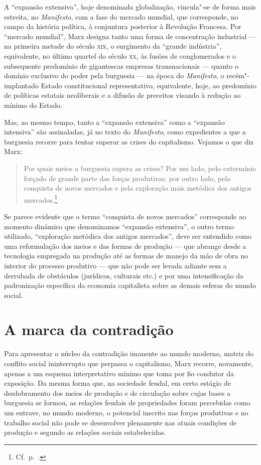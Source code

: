 A “expansão extensiva”, hoje denominada globalização, vincula"-se de
forma mais estreita, no \textit{Manifesto}, com a fase do mercado
mundial, que corresponde, no campo da história política, à conjuntura
posterior à Revolução Francesa. Por “mercado mundial”, Marx designa
tanto uma forma de concentração industrial --- na primeira metade do
século \textsc{xix}, o surgimento da “grande indústria”, equivalente, no último
quartel do século \textsc{xx}, às fusões de conglomerados e o subsequente
predomínio de gigantescas empresas transnacionais --- quanto o domínio
exclusivo do poder pela burguesia --- na época do \textit{Manifesto}, o
recém"-implantado Estado constitucional representativo, equivalente,
hoje, ao predomínio de políticas estatais neoliberais e a difusão de
preceitos visando à redução ao mínimo do Estado.

Mas, ao mesmo tempo, tanto a “expansão extensiva” como a “expansão
intensiva” são assinaladas, já no texto do \textit{Manifesto}, como
expedientes a que a burguesia recorre para tentar superar as crises do
capitalismo. Vejamos o que diz Marx:

\begin{quote} 
Por quais meios a burguesia supera as crises? Por um lado, pelo
extermínio forçado de grande parte das forças produtivas; por outro
lado, pela conquista de novos mercados e pela exploração mais metódica
dos antigos mercados.\footnote{ Cf.~p.~\pageref{9}.}
\end{quote} 

Se parece evidente que o termo “conquista de novos mercados” corresponde
ao momento dinâmico que denominamos “expansão extensiva”, o outro termo
utilizado, “exploração metódica dos antigos mercados”, deve ser
entendido como uma reformulação dos meios e das formas de produção --- que
abrange desde a tecnologia empregada na produção até as formas de
manejo da mão de obra no interior do processo produtivo --- que não
pode ser levada adiante sem a derrubada de obstáculos (jurídicos,
culturais etc.) e por uma intensificação da padronização específica da
economia capitalista sobre as demais esferas do mundo social.

\section*{A marca da contradição}

Para apresentar o núcleo da contradição imanente ao mundo moderno,
matriz do conflito social ininterrupto que perpassa o capitalismo, Marx
recorre, novamente, apenas a um esquema interpretativo mínimo que toma
por fio condutor da exposição. Da mesma forma que, na sociedade feudal,
em certo estágio de desdobramento dos meios de produção e de circulação
sobre cujas bases a burguesia se formou, as relações feudais de
propriedades foram percebidas como um entrave, no mundo moderno, o
potencial inscrito nas forças produtivas e no trabalho social não pode
se desenvolver plenamente nas atuais condições de produção e segundo as
relações sociais estabelecidas.

